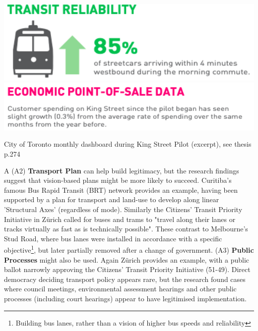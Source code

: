 \documentclass{tufte-handout}
\begin{document}
\begin{marginfigure}%
  \includegraphics[width=\linewidth]{Toronto_dashboard_1}
   \includegraphics[width=\linewidth]{Toronto_dashboard_4}
  \caption{City of Toronto monthly dashboard during King Street Pilot (excerpt), see thesis p.274}
  \label{fig:Toronto_dashboard}
\end{marginfigure}

A (A2) \textbf{Transport Plan} can help build legitimacy, but the research findings suggest that vision-based plans might be more likely to succeed. Curitiba's famous Bus Rapid Transit (BRT) network provides an example, having been supported by a plan for transport and land-use to develop along linear 'Structural Axes' (regardless of mode). Similarly the Citizens' Transit Priority Initiative in Zürich called for buses and trams to "travel along their lanes or tracks virtually as fast as is technically possible"\cite{Nash:2001ab}. These contrast to Melbourne's Stud Road, where bus lanes were installed in accordance with a specific objective\footnote{Building bus lanes, rather than a vision of higher bus speeds and reliability}, but later partially removed after a change of government. (A3) \textbf{Public Processes} might also be used. Again Zürich provides an example, with a public ballot narrowly approving the Citizens' Transit Priority Initiative (51-49). Direct democracy deciding transport policy appears rare, but the research found cases where council meetings, environmental assessment hearings and other public processes (including court hearings) appear to have legitimised implementation.  
\end{document}
